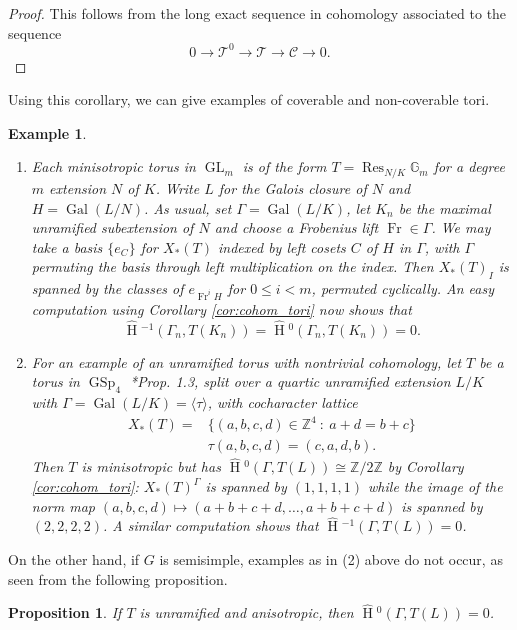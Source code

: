 \documentclass{mrlart7}
\theoremstyle{plain}
\newtheorem{proposition}[theorem]{Proposition}
\newtheorem{example}[theorem]{Example}
\newcommand{\HT}[1]{\hat{\HH}{}^{#1}}
\theoremstyle{definition}
\numberwithin{equation}{section}
\DeclareMathOperator{\Gal}{Gal}
\DeclareMathOperator{\HH}{H}
\DeclareMathOperator{\Res}{Res}
\DeclareMathOperator{\Fr}{Fr}
\DeclareMathOperator{\GL}{GL}
\DeclareMathOperator{\GSp}{GSp}
\newcommand{\TT}{\mathcal{T}}
\newcommand{\C}{\mathcal{C}}
\newcommand{\ZZ}{\mathbb{Z}}
\newcommand{\Gm}{\mathbb{G}_m}
\begin{document}
\begin{proof}
This follows from the long exact sequence in cohomology associated to the sequence
$$0 \rightarrow \TT^0 \rightarrow \TT \rightarrow \C \rightarrow 0.$$
\end{proof}

Using this corollary, we can give examples of coverable and non-coverable tori.

\begin{example} $ $
\begin{enumerate}
\item Each minisotropic torus in $\GL_m$ is of the form $T = \Res_{N/K} \Gm$ for a degree $m$ extension $N$ of $K$.
Write $L$ for the Galois closure of $N$ and $H = \Gal(L/N)$.  As usual, set $\Gamma=\Gal(L/K)$, let $K_n$ be the
maximal unramified subextension of $N$ and choose a Frobenius lift $\Fr \in \Gamma$.
We may take a basis $\{e_C\}$ for $X_*(T)$ indexed by left cosets $C$ of $H$ in $\Gamma$, with $\Gamma$
permuting the basis through left multiplication on the index.  Then $X_*(T)_I$ is spanned by the classes of
$e_{\Fr^i H}$ for $0 \le i < m$, permuted cyclically.  An easy computation using Corollary \ref{cor:cohom_tori} now shows that
\[
\HT{-1}(\Gamma_n, T(K_n)) = \HT{0}(\Gamma_n, T(K_n)) = 0.
\]

\item For an example of an unramified torus with nontrivial cohomology, let $T$ be a torus in $\GSp_4$ \cite{morris:91a}*{Prop. 1.3}, split over a quartic unramified extension
$L/K$ with $\Gamma = \Gal(L/K) = \langle \tau \rangle$, with cocharacter lattice
\begin{align*}
X_*(T) = &\{(a,b,c,d) \in \ZZ^4 \: : \: a + d = b + c\} \\
& \tau(a,b,c,d) = (c,a,d,b).
\end{align*}
Then $T$ is minisotropic but has $\HT{0}(\Gamma, T(L)) \cong \ZZ/2\ZZ$ by Corollary \ref{cor:cohom_tori}:
$X_*(T)^\Gamma$ is spanned by $(1,1,1,1)$ while the image of the norm map $(a,b,c,d) \mapsto (a+b+c+d,\ldots,a+b+c+d)$
is spanned by $(2,2,2,2)$.  A similar computation shows that $\HT{-1}(\Gamma, T(L)) = 0$.
\end{enumerate}
\end{example}

On the other hand, if $G$ is semisimple, examples as in (2) above do not occur, as seen from the following proposition.

\begin{proposition}\label{prop:vanishing_H0}
If $T$ is unramified and anisotropic, then $\HT{0}(\Gamma, T(L)) = 0$.
\end{proposition}
\end{document}
